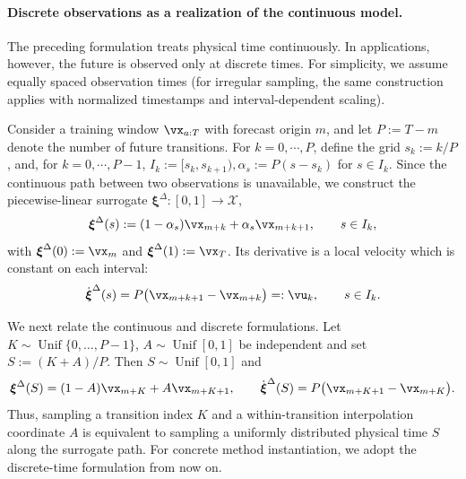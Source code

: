 \paragraph{Discrete observations as a realization of the continuous model.} 
The preceding formulation treats physical time continuously.  In applications,
however, the future is observed only at discrete times.  For simplicity, we
assume equally spaced observation times (for irregular sampling, the
same construction applies with normalized timestamps and interval-dependent
scaling). 
 
Consider a training window $\vx_{a:T}$ with forecast origin
$m$, and let $P := T-m$ denote the number of future transitions. For $k = 0, \cdots, P$, define the grid $s_k := k/P$, and, for $k=0, \cdots, P-1$, $ I_k:=[s_k,s_{k+1}), \alpha_s:=P(s-s_k)$ for $s\in I_k$. Since the continuous path between two observations is unavailable, we
construct the piecewise-linear surrogate
$\boldsymbol{\xi}^{\Delta}:[0,1]\to\mathcal X$,
\begin{equation}
    \boldsymbol{\xi}^{\Delta}(s)
    :=
    (1-\alpha_s)\vx_{m+k}
    +
    \alpha_s\vx_{m+k+1},
    \qquad
    s\in I_k,
    \label{eq:physical_time_interpolation}
\end{equation}
with
$\boldsymbol{\xi}^{\Delta}(0):=\vx_m$
and
$\boldsymbol{\xi}^{\Delta}(1):=\vx_T$. Its derivative is a local velocity which  is constant on each interval: 
\begin{equation}
    \dot{\boldsymbol{\xi}}^{\Delta}(s)
    =
    P
    \bigl(
        \vx_{m+k+1}-\vx_{m+k}
    \bigr)
    =:
    \vu_k,
    \qquad
    s\in I_k.
    \label{eq:physical_time_velocity}
\end{equation}


We next relate the continuous and discrete formulations. Let $K \sim\operatorname{Unif}\{0,\ldots,P-1\}$, $A\sim\operatorname{Unif}[0,1]$ be independent and set $S := (K+A)/P$. Then $S \sim \operatorname{Unif}[0,1]$ and 
\begin{equation}
    \boldsymbol{\xi}^{\Delta}(S)
    =
    (1-A)\vx_{m+K}
    +
    A\vx_{m+K+1},
 \qquad 
    \dot{\boldsymbol{\xi}}^{\Delta}(S)
    =
    P
    \bigl(
        \vx_{m+K+1}-\vx_{m+K}
    \bigr).
    \label{eq:sampled_velocity}
\end{equation}
Thus,  sampling a transition index $K$ and a within-transition interpolation coordinate $A$ is equivalent to sampling a uniformly distributed
physical time $S$ along the surrogate path. For concrete method instantiation, we adopt the discrete-time formulation from now on.



